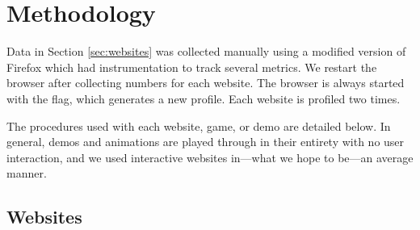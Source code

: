 \appendix

\section{Methodology}
\label{app:methodology}

Data in Section \ref{sec:websites} was collected manually using a modified
version of Firefox which had instrumentation to track several metrics. We
restart the browser after collecting numbers for each website. The browser is
always started with the  flag, which generates a new
profile. Each website is profiled two times.

The procedures used with each website, game, or demo are detailed below. In
general, demos and animations are played through in their entirety with no
user interaction, and we used interactive websites in---what we hope to
be---an average manner.

\subsection{Websites}

